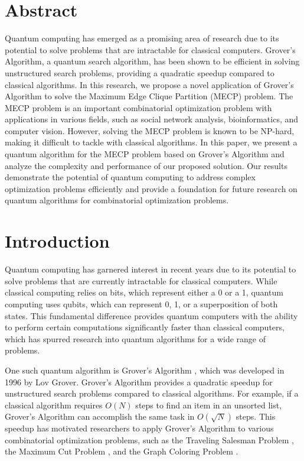 \section{Abstract}

Quantum computing has emerged as a promising area of research due to its potential to solve problems that are intractable for classical computers. Grover's Algorithm, a quantum search algorithm, has been shown to be efficient in solving unstructured search problems, providing a quadratic speedup compared to classical algorithms. In this research, we propose a novel application of Grover's Algorithm to solve the Maximum Edge Clique Partition (MECP) problem. The MECP problem is an important combinatorial optimization problem with applications in various fields, such as social network analysis, bioinformatics, and computer vision. However, solving the MECP problem is known to be NP-hard, making it difficult to tackle with classical algorithms. In this paper, we present a quantum algorithm for the MECP problem based on Grover's Algorithm and analyze the complexity and performance of our proposed solution. Our results demonstrate the potential of quantum computing to address complex optimization problems efficiently and provide a foundation for future research on quantum algorithms for combinatorial optimization problems.

\section{Introduction}

Quantum computing has garnered interest in recent years due to its potential to solve problems that are currently intractable for classical computers. While classical computing relies on bits, which represent either a 0 or a 1, quantum computing uses qubits, which can represent 0, 1, or a superposition of both states. This fundamental difference provides quantum computers with the ability to perform certain computations significantly faster than classical computers, which has spurred research into quantum algorithms for a wide range of problems.

One such quantum algorithm is Grover's Algorithm \cite{grover1996fast}, which was developed in 1996 by Lov Grover. Grover's Algorithm provides a quadratic speedup for unstructured search problems compared to classical algorithms. For example, if a classical algorithm requires $O(N)$ steps to find an item in an unsorted list, Grover's Algorithm can accomplish the same task in $O(\sqrt{N})$ steps. This speedup has motivated researchers to apply Grover's Algorithm to various combinatorial optimization problems, such as the Traveling Salesman Problem \cite{ambainis2019quantum}, the Maximum Cut Problem \cite{hadfield2019quantum}, and the Graph Coloring Problem \cite{zhou2020quantum}.

